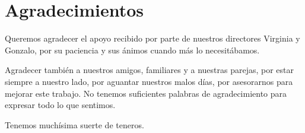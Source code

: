 
\chapter*{Agradecimientos}

Queremos agradecer el apoyo recibido por parte de nuestros directores Virginia y Gonzalo, por su paciencia y sus ánimos cuando más lo necesitábamos.

Agradecer también a nuestros amigos, familiares y a nuestras parejas, por estar siempre a nuestro lado, por aguantar nuestros malos días, por asesorarnos para mejorar este trabajo.
No tenemos suficientes palabras de agradecimiento para expresar todo lo que sentimos.

Tenemos muchísima suerte de teneros.
 











